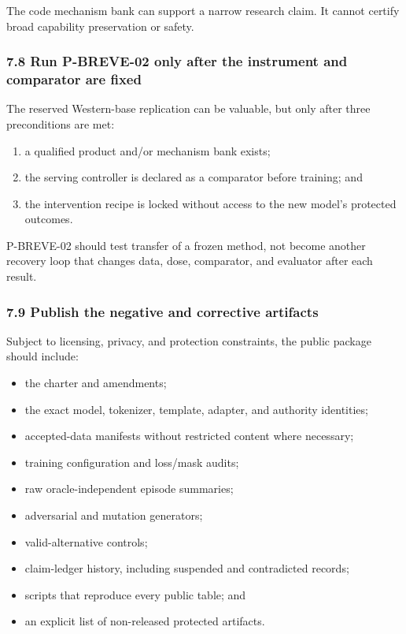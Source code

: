\documentclass[
  9pt,
  letterpaper,
]{article}
\providecommand{\tightlist}{%
  \setlength{\itemsep}{0pt}\setlength{\parskip}{0pt}}
\begin{document}
The code mechanism bank can support a narrow research claim. It cannot
certify broad capability preservation or safety.

\hypertarget{78-run-p-breve-02-only-after-the-instrument-and-comparator-are-fixed}{%
\subsubsection{7.8 Run P-BREVE-02 only after the instrument and
comparator are
fixed}\label{78-run-p-breve-02-only-after-the-instrument-and-comparator-are-fixed}}

The reserved Western-base replication can be valuable, but only after
three preconditions are met:

\begin{enumerate}
\def\labelenumi{\arabic{enumi}.}
\tightlist
\item
  a qualified product and/or mechanism bank exists;
\item
  the serving controller is declared as a comparator before training;
  and
\item
  the intervention recipe is locked without access to the new model's
  protected outcomes.
\end{enumerate}

P-BREVE-02 should test transfer of a frozen method, not become another
recovery loop that changes data, dose, comparator, and evaluator after
each result.

\hypertarget{79-publish-the-negative-and-corrective-artifacts}{%
\subsubsection{7.9 Publish the negative and corrective
artifacts}\label{79-publish-the-negative-and-corrective-artifacts}}

Subject to licensing, privacy, and protection constraints, the public
package should include:

\begin{itemize}
\tightlist
\item
  the charter and amendments;
\item
  the exact model, tokenizer, template, adapter, and authority
  identities;
\item
  accepted-data manifests without restricted content where necessary;
\item
  training configuration and loss/mask audits;
\item
  raw oracle-independent episode summaries;
\item
  adversarial and mutation generators;
\item
  valid-alternative controls;
\item
  claim-ledger history, including suspended and contradicted records;
\item
  scripts that reproduce every public table; and
\item
  an explicit list of non-released protected artifacts.
\end{itemize}
\end{document}
